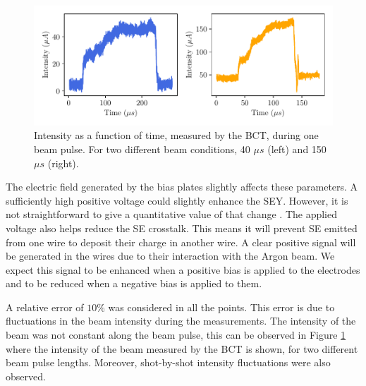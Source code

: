 \begin{figure}[h]
    \vspace{-0.4cm}
    \centering
    \includegraphics[width=0.95\columnwidth]{BCTSignalExample/BCTSignalExamples.pdf}
    \caption{Intensity as a function of time, measured by the BCT, during one beam pulse. For two different beam conditions, 40 $\mu s$ (left) and 150 $\mu s$ (right).}
    \label{fig:BCTExample}
\end{figure}

The electric field generated by the bias plates slightly affects these parameters. A sufficiently high positive voltage could slightly enhance the SEY. However, it is not straightforward to give a quantitative value of that change \parencite[]{ref:VoltageOnSEY1}  \parencite[]{ref:VoltageOnSEY2}. The applied voltage also helps reduce the SE crosstalk. This means it will prevent SE emitted from one wire to deposit their charge in another wire. A clear positive signal will be generated in the wires due to their interaction with the Argon beam. We expect this signal to be enhanced when a positive bias is applied to the electrodes and to be reduced when a negative bias is applied to them.

A relative error of $10\%$ was considered in all the points. This error is due to fluctuations in the beam intensity during the measurements. The intensity of the beam was not constant along the beam pulse, this can be observed in Figure \ref{fig:BCTExample} where the intensity of the beam measured by the BCT is shown, for two different beam pulse lengths. Moreover, shot-by-shot intensity fluctuations were also observed. 

